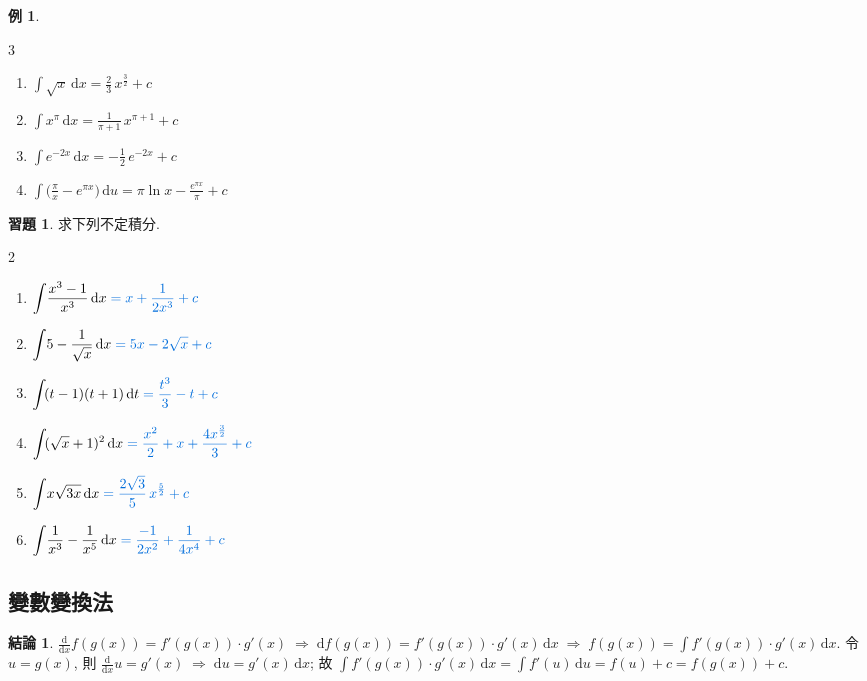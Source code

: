 \documentclass[12pt]{extarticle}
\newcommand{\ds}{\displaystyle}
\newcommand{\ie}{\;\Longrightarrow\;}
\theoremstyle{definition}
\newtheorem*{fact}{結論}
\newtheorem*{ex}{例}
\newtheorem*{exe}{習題}
\begin{document}
\begin{ex}
  \setlength{\columnsep}{-7mm}
  \begin{multicols}{3}
    \begin{enumerate}\setlength{\itemsep}{0pt}
      \item $\ds\int\!\sqrt{x}\,\text{d}x = \frac{2}{3}\,x^{\frac{3}{2}} + c$
      \item $\ds\int x^\pi\,\text{d}x = \frac{1}{\pi + 1}\,x^{\pi + 1} + c$
      \item $\ds\int e^{-2x}\,\text{d}x = -\frac{1}{2}\,e^{-2 x} + c$
      \item $\ds\int\!\big(\frac{\pi}{x} - e^{\pi x}\big)\,\text{d}u = \pi\ln x - \frac{e^{\pi x}}{\pi} + c$
    \end{enumerate} 
  \end{multicols}
\end{ex}

\begin{exe} 求下列不定積分. 
  \setlength{\columnsep}{-2cm}
  \begin{multicols}{2}
    \begin{enumerate}\setlength{\itemsep}{0pt}
      \item $\ds\int\!\frac{x^3 - 1}{x^3}\,\mathrm{d}x {\color{C2}\;= x + \frac{1}{2x^3} + c}$
      \item $\ds\int\!5 - \frac{1}{\sqrt{x}}\,\mathrm{d}x {\color{C2}\;= 5x - 2\sqrt{x} + c}$
      \item $\ds\int\!(t - 1)(t + 1)\,\mathrm{d}t {\color{C2}\;= \frac{t^3}{3} - t + c}$
      \item $\ds\int\!(\sqrt{x} + 1)^2\,\mathrm{d}x {\color{C2}\;= \frac{x^2}{2} + x + \frac{4 x^{\frac{3}{2}}}{3} + c}$
      \item $\ds\int\!x\sqrt{3x}\,\mathrm{d}x {\color{C2}\;= \frac{2\sqrt{3}}{5}\,x^{\frac{5}{2}} + c}$
      \item $\ds\int\!\frac{1}{x^3} - \frac{1}{x^5}\,\mathrm{d}x {\color{C2}\;= \frac{-1}{2x^2} + \frac{1}{4x^4} + c}$
    \end{enumerate} 
  \end{multicols}
\end{exe}
\subsection*{變數變換法}

\begin{fact}
  $\ds\frac{\text{d}}{\text{d}x}f(g(x)) = f'(g(x))\cdot g'(x) \ie \text{d}f(g(x)) = f'(g(x))\cdot g'(x)\,\text{d}x \ie f(g(x)) = \int f'(g(x))\cdot g'(x)\,\text{d}x$. 令 $\ds u = g(x)$, 則 $\ds\frac{\text{d}}{\text{d}x} u = g'(x)\ie \text{d} u = g'(x)\,\text{d}x$; 故 $\ds\int f'(g(x))\cdot g'(x)\,\text{d}x = \int f'(u)\,\text{d}u = f(u) + c = f(g(x)) + c$.  
\end{fact}
\end{document}
